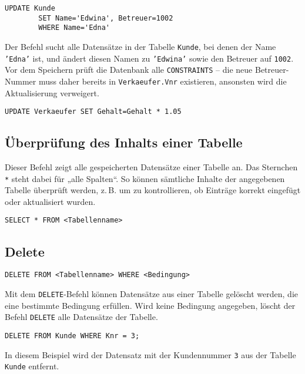     \begin{lstlisting}[style=sqlstyle]
    UPDATE Kunde
        SET Name='Edwina', Betreuer=1002
        WHERE Name='Edna'
    \end{lstlisting}
Der Befehl sucht alle Datensätze in der Tabelle \texttt{Kunde}, bei denen der Name \texttt{'Edna'} ist, 
und ändert diesen Namen zu \texttt{'Edwina'} sowie den Betreuer auf \texttt{1002}. 
Vor dem Speichern prüft die Datenbank alle \texttt{CONSTRAINTS} – 
die neue Betreuer-Nummer muss daher bereits in \texttt{Verkaeufer.Vnr} existieren, 
ansonsten wird die Aktualisierung verweigert.

    \begin{lstlisting}[style=sqlstyle]
        UPDATE Verkaeufer SET Gehalt=Gehalt * 1.05
    \end{lstlisting}


\subsection{Überprüfung des Inhalts einer Tabelle}
    Dieser Befehl zeigt alle gespeicherten Datensätze einer Tabelle an.  
    Das Sternchen \texttt{*} steht dabei für „alle Spalten“.  
    So können sämtliche Inhalte der angegebenen Tabelle überprüft werden, 
    z.\,B. um zu kontrollieren, ob Einträge korrekt eingefügt oder aktualisiert wurden.

    \begin{lstlisting}[style=sqlstyle]
        SELECT * FROM <Tabellenname>
    \end{lstlisting}



\subsection{Delete}
    \begin{lstlisting}[style=sqlstyle]
DELETE FROM <Tabellenname> WHERE <Bedingung>
    \end{lstlisting}

    Mit dem \texttt{DELETE}-Befehl können Datensätze aus einer Tabelle gelöscht werden, 
    die eine bestimmte Bedingung erfüllen. Wird keine Bedingung angegeben, 
    löscht der Befehl \texttt{DELETE} alle Datensätze der Tabelle.

    \begin{lstlisting}[style=sqlstyle]
        DELETE FROM Kunde WHERE Knr = 3;
    \end{lstlisting}
    In diesem Beispiel wird der Datensatz mit der Kundennummer \texttt{3} aus der Tabelle \texttt{Kunde} entfernt.

